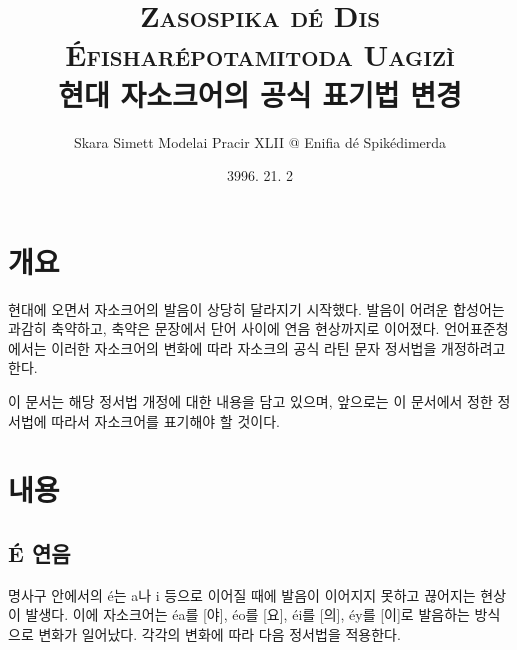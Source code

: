 \documentclass{article}
\title{
	\textsc{Zasospika dé Dis \\ Éfisharépotamitoda Uagizì \\
	\large 현대 자소크어의 공식 표기법 변경}
}
\author{Skara Simett Modelai Pracir XLII @ Enifia dé Spikédimerda}
\date{3996. 21. 2}
\begin{document}
\maketitle

\pagebreak

\section{개요}

현대에 오면서 자소크어의 발음이 상당히 달라지기 시작했다. 발음이 어려운 합성어는 과감히 축약하고, 축약은 문장에서 단어 사이에 연음 현상까지로 이어졌다. 언어표준청에서는 이러한 자소크어의 변화에 따라 자소크의 공식 라틴 문자 정서법을 개정하려고 한다.

이 문서는 해당 정서법 개정에 대한 내용을 담고 있으며, 앞으로는 이 문서에서 정한 정서법에 따라서 자소크어를 표기해야 할 것이다.

\section{내용}

\subsection{É 연음}

명사구 안에서의 é는 a나 i 등으로 이어질 때에 발음이 이어지지 못하고 끊어지는 현상이 발생다. 이에 자소크어는 éa를 [야], éo를 [요], éi를 [의], éy를 [이]로 발음하는 방식으로 변화가 일어났다. 각각의 변화에 따라 다음 정서법을 적용한다.
\end{document}
